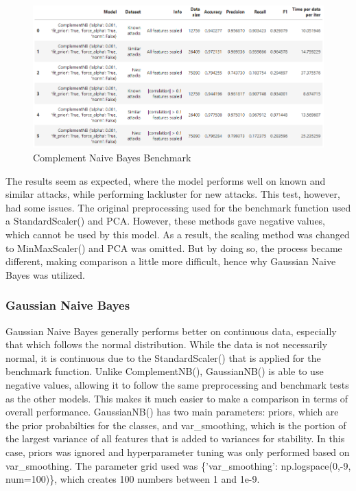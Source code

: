 \begin{figure}[!htb]
    \centering
    \includegraphics[width=\linewidth]{figures//naive_bayes/comp_nb_bench.png}
    \caption{Complement Naive Bayes Benchmark}%
    \label{fig:comp_nb_bench}
\end{figure}

The results seem as expected, where the model performs well on known and similar attacks, while performing lackluster for new attacks. This test, however, had some issues. The original preprocessing used for the benchmark function used a StandardScaler() and PCA. However, these methods gave negative values, which cannot be used by this model. As a result, the scaling method was changed to MinMaxScaler() and PCA was omitted. But by doing so, the process became different, making comparison a little more difficult, hence why Gaussian Naive Bayes was utilized.


\subsubsection{Gaussian Naive Bayes}
Gaussian Naive Bayes generally performs better on continuous data, especially that which follows the normal distribution. While the data is not necessarily normal, it is continuous due to the StandardScaler() that is applied for the benchmark function. Unlike ComplementNB(), GaussianNB() is able to use negative values, allowing it to follow the same preprocessing and benchmark tests as the other models. This makes it much easier to make a comparison in terms of overall performance. GaussianNB() has two main parameters: priors, which are the prior probabilties for the classes, and var\_smoothing, which is the portion of the largest variance of all features that is added to variances for stability. In this case, priors was ignored and hyperparameter tuning was only performed based on var\_smoothing. The parameter grid used was \{'var\_smoothing': np.logspace(0,-9, num=100)\}, which creates 100 numbers between 1 and 1e-9.

